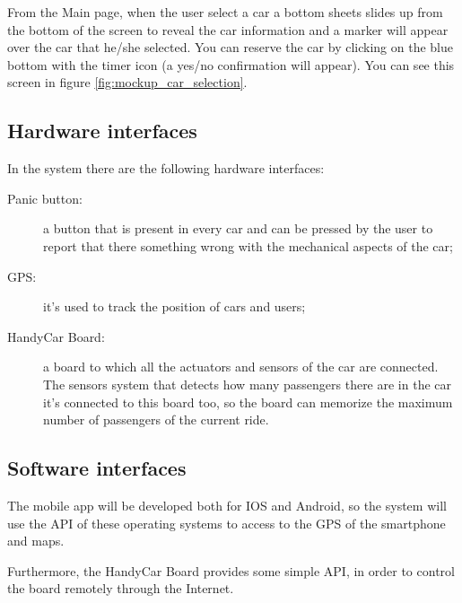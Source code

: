 From the Main page, when the user select a car a bottom sheets slides up from the bottom of the screen to reveal the car information and a marker will appear over the car that he/she selected. You can reserve the car by clicking on the blue bottom with the timer icon (a yes/no confirmation will appear). You can see this screen in figure \ref{fig:mockup_car_selection}.

\subsection{Hardware interfaces}
In the system there are the following hardware interfaces:
\begin{description}
	\item [Panic button:] a button that is present in every car and can be pressed by the user to report that there something wrong with the mechanical aspects of the car;
	\item [GPS:] it's used to track the position of cars and users;
	\item [HandyCar Board:] a board to which all the actuators and sensors of the car are connected. The sensors system that detects how many passengers there are in the car it's connected to this board too, so the board can memorize the maximum number of passengers of the current ride.
\end{description}

\subsection{Software interfaces}
The mobile app will be developed both for IOS and Android, so the system will use the API of these operating systems to access to the GPS of the smartphone and maps.

Furthermore, the HandyCar Board provides some simple API, in order to control the board remotely through the Internet.




